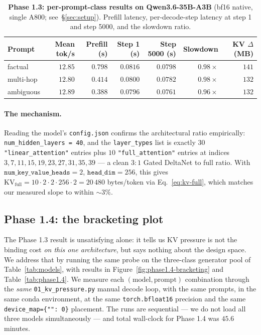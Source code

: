\documentclass[11pt,letterpaper]{article}
\begin{document}
\begin{table}[t]
\centering
\small
\caption{
\textbf{Phase 1.3: per-prompt-class results on Qwen3.6-35B-A3B}
(bf16 native, single A800; see~\S\ref{sec:setup}). Prefill latency, per-decode-step
latency at step 1 and step 5000, and the slowdown ratio.
}
\label{tab:phase1.3}
\begin{tabular}{lrrrrrr}
\toprule
\textbf{Prompt} &
\textbf{Mean tok/s} &
\textbf{Prefill (s)} &
\textbf{Step 1 (s)} &
\textbf{Step 5000 (s)} &
\textbf{Slowdown} &
\textbf{KV $\Delta$ (MB)} \\
\midrule
factual & $12.85$ & $0.798$ & $0.0816$ & $0.0798$ & $0.98\times$ & $141$ \\
multi-hop & $12.80$ & $0.414$ & $0.0800$ & $0.0782$ & $0.98\times$ & $132$ \\
ambiguous & $12.89$ & $0.388$ & $0.0796$ & $0.0761$ & $0.96\times$ & $132$ \\
\bottomrule
\end{tabular}
\end{table}

\paragraph{The mechanism.}
Reading the model's \texttt{config.json} confirms the architectural
ratio empirically: \verb|num_hidden_layers = 40|, and the
\verb|layer_types| list is exactly $30$ \verb|"linear_attention"|
entries plus $10$ \verb|"full_attention"| entries at indices
$3, 7, 11, 15, 19, 23, 27, 31, 35, 39$ — a clean $3{:}1$ Gated DeltaNet
to full ratio. With $\texttt{num\_key\_value\_heads}=2$,
$\texttt{head\_dim}=256$, this gives
$\mathrm{KV}_\mathrm{full} = 10 \cdot 2 \cdot 2 \cdot 256 \cdot 2 = 20\,480$
bytes/token via Eq.~\eqref{eq:kv-full}, which matches our measured slope to
within $\sim 3\%$.

\subsection{Phase 1.4: the bracketing plot}
\label{sec:phase1.4}

The Phase 1.3 result is unsatisfying alone: it tells us KV pressure is
not the binding cost \emph{on this one architecture}, but says nothing
about the design space. We address that by running the same probe on
the three-class generator pool of Table~\ref{tab:models}, with results
in Figure~\ref{fig:phase1.4-bracketing} and
Table~\ref{tab:phase1.4}. We measure each
$(\text{model}, \text{prompt})$ combination through the
\emph{same} \texttt{01\_kv\_pressure.py} manual decode loop, with the
same prompts, in the same conda environment, at the same
\texttt{torch.bfloat16} precision and the same
\verb|device_map={"": 0}| placement. The runs are sequential — we do
not load all three models simultaneously — and total wall-clock for
Phase 1.4 was $45.6$ minutes.
\end{document}
